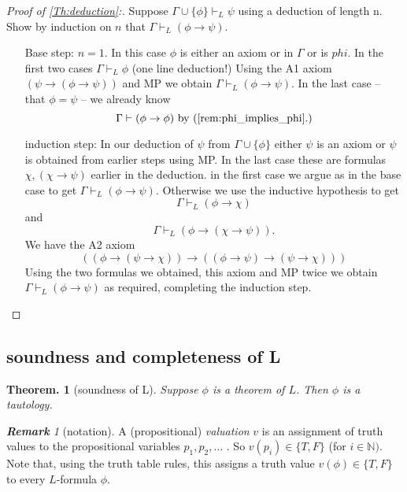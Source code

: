 \documentclass[a4paper,oneside,11pt,DIV=12,parskip=half]{scrartcl}
\newcommand{\N}{\mathbb N}
\theoremstyle{plain}
\newtheorem{theorem}{Theorem.}[section]
\theoremstyle{definition}
\newtheorem{remark, definition}[theorem]{Remark and Definition.}
\newtheorem{lemma, definition}[theorem]{Lemma and Definition.}
\newtheorem{theorem, definition}[theorem]{Theorem and Definition.}
\theoremstyle{remark}
\newtheorem*{remark}{\textbf{Remark}}
\newtheorem*{remark, example}{\textbf{Remark and Exercise}}
\begin{document}
\begin{proof}[Proof of \ref{Th:deduction}:]
Suppose $\Gamma \cup \{\phi\} \vdash_L \psi$ using a deduction of length n. Show by induction on $n$ that $\Gamma \vdash_L (\phi \rightarrow \psi).$
\begin{itemize}
    \item[Base step:] $n = 1$. In this case $\phi$ is either an axiom or in $\Gamma$ or is $phi$. In the first two cases $\Gamma \vdash_L \phi$ (one line deduction!) Using the A1 axiom $(\psi \rightarrow (\phi \rightarrow \psi))$ and MP we obtain $\Gamma \vdash_L (\phi \rightarrow \psi)$.
    In the last case -- that $\phi = \psi$ -- we already know 
     \[ \Gamma \vdash (\phi \rightarrow \phi) \text{ by (\ref{rem:phi_implies_phi}.)} \]
    
     \item[induction step:] In our deduction of $\psi$ from $\Gamma \cup \{\phi\}$ either $\psi$ is an axiom or $\psi$ is obtained from earlier steps using MP. In the last case these are formulas $\chi, (\chi \rightarrow \psi)$ earlier in the deduction.
     in the first case we argue as in the base case to get $\Gamma \vdash_L (\phi \rightarrow \psi)$.
     Otherwise we use the inductive hypothesis to get $$\Gamma \vdash_L (\phi \rightarrow \chi)$$ and 
        \[ \Gamma \vdash_L (\phi \rightarrow (\chi \rightarrow \psi)). \]
    We have the A2 axiom 
        \[ ((\phi \rightarrow (\psi \rightarrow \chi)) \rightarrow ((\phi \rightarrow \psi) \rightarrow (\psi \rightarrow \chi))) \]
    Using the two formulas we obtained, this axiom and MP twice we obtain $\Gamma \vdash_L (\phi \rightarrow \psi)$ as required, completing the induction step.
\end{itemize}
\end{proof}

\subsection{soundness and completeness of L}

\begin{theorem}[soundness of L] \label{Th:soundness}
Suppose $\phi$ is a theorem of $L$. Then $\phi$ is a tautology.
\end{theorem}
\begin{remark}[notation]
 A (propositional) \emph{valuation} $v$ is an assignment of truth values to the propositional variables $p_1,p_2,\dots$ .
 So $v(p_i) \in \{ T, F \}$ (for $i \in \N)$.
 Note that, using the truth table rules, this assigns a truth value $v(\phi) \in \{ T, F \}$ to every $L$-formula $\phi$.
\end{remark}
\end{document}
